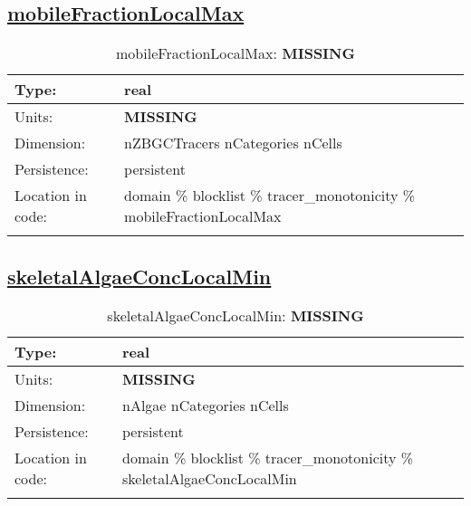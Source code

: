\subsection[mobileFractionLocalMax]{\hyperref[sec:var_tab_tracer_monotonicity]{mobileFractionLocalMax}}
\label{subsec:var_sec_tracer_monotonicity_mobileFractionLocalMax}
\begin{center}
\begin{longtable}{| p{2.0in} | p{4.0in} |}
        \hline 
        Type: & real \\
        \hline 
        Units: & {\bf \color{red} MISSING} \\
        \hline 
        Dimension: & nZBGCTracers nCategories nCells \\
        \hline 
        Persistence: & persistent \\
        \hline 
         Location in code: & domain \% blocklist \% tracer\_monotonicity \% mobileFractionLocalMax \\
         \hline 
    \caption{mobileFractionLocalMax: {\bf \color{red} MISSING}}
\end{longtable}
\end{center}
\subsection[skeletalAlgaeConcLocalMin]{\hyperref[sec:var_tab_tracer_monotonicity]{skeletalAlgaeConcLocalMin}}
\label{subsec:var_sec_tracer_monotonicity_skeletalAlgaeConcLocalMin}
\begin{center}
\begin{longtable}{| p{2.0in} | p{4.0in} |}
        \hline 
        Type: & real \\
        \hline 
        Units: & {\bf \color{red} MISSING} \\
        \hline 
        Dimension: & nAlgae nCategories nCells \\
        \hline 
        Persistence: & persistent \\
        \hline 
         Location in code: & domain \% blocklist \% tracer\_monotonicity \% skeletalAlgaeConcLocalMin \\
         \hline 
    \caption{skeletalAlgaeConcLocalMin: {\bf \color{red} MISSING}}
\end{longtable}
\end{center}

